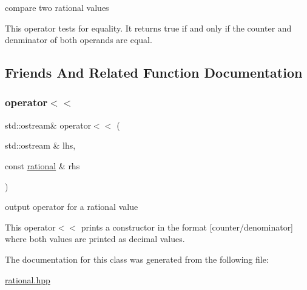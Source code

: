 compare two rational values 

This operator tests for equality. It returns true if and only if the counter and denminator of both operands are equal. 

\subsection{Friends And Related Function Documentation}
\mbox{\label{classrational_a5b7c78fca4537715369ba7da02abb4df}} 
\subsubsection{\texorpdfstring{operator$<$$<$}{operator<<}}
{\footnotesize\ttfamily std\+::ostream\& operator$<$$<$ (\begin{DoxyParamCaption}\item[{std\+::ostream \&}]{lhs,  }\item[{const \hyperlink{classrational}{rational} \&}]{rhs }\end{DoxyParamCaption})\hspace{0.3cm}{\ttfamily [friend]}}



output operator for a rational value 

This operator$<$$<$ prints a constructor in the format \mbox{[}counter/denominator\mbox{]} where both values are printed as decimal values. 

The documentation for this class was generated from the following file\+:\begin{DoxyCompactItemize}
\item 
\hyperlink{rational_8hpp}{rational.\+hpp}\end{DoxyCompactItemize}
